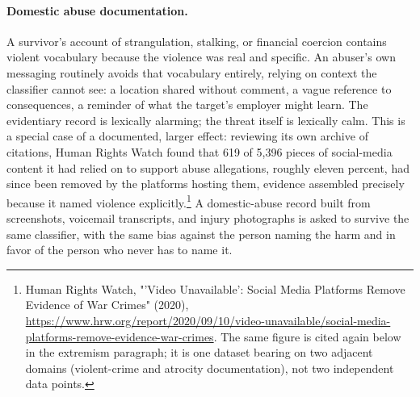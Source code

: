 \documentclass[11pt]{article}
\begin{document}
\paragraph{Domestic abuse documentation.} A survivor's account of strangulation, stalking, or financial coercion contains violent vocabulary because the violence was real and specific. An abuser's own messaging routinely avoids that vocabulary entirely, relying on context the classifier cannot see: a location shared without comment, a vague reference to consequences, a reminder of what the target's employer might learn. The evidentiary record is lexically alarming; the threat itself is lexically calm. This is a special case of a documented, larger effect: reviewing its own archive of citations, Human Rights Watch found that 619 of 5,396 pieces of social-media content it had relied on to support abuse allegations, roughly eleven percent, had since been removed by the platforms hosting them, evidence assembled precisely because it named violence explicitly.\footnote{Human Rights Watch, "'Video Unavailable': Social Media Platforms Remove Evidence of War Crimes" (2020), \url{https://www.hrw.org/report/2020/09/10/video-unavailable/social-media-platforms-remove-evidence-war-crimes}. The same figure is cited again below in the extremism paragraph; it is one dataset bearing on two adjacent domains (violent-crime and atrocity documentation), not two independent data points.} A domestic-abuse record built from screenshots, voicemail transcripts, and injury photographs is asked to survive the same classifier, with the same bias against the person naming the harm and in favor of the person who never has to name it.
\end{document}
